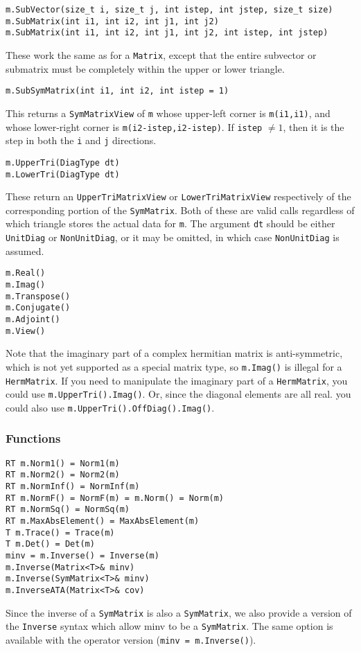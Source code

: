\documentclass[twoside,letterpaper,11pt]{article}
\renewcommand{\tt}[1]{{\texttt {#1}}}
\begin{document}
\begin{verbatim}
m.SubVector(size_t i, size_t j, int istep, int jstep, size_t size)
m.SubMatrix(int i1, int i2, int j1, int j2)
m.SubMatrix(int i1, int i2, int j1, int j2, int istep, int jstep)
\end{verbatim}
These work the same as for a \tt{Matrix}, except that the entire
subvector or submatrix must be completely within the upper or lower triangle.

\begin{verbatim}
m.SubSymMatrix(int i1, int i2, int istep = 1)
\end{verbatim}
This returns a \tt{SymMatrixView} of \tt{m} whose upper-left
corner is \tt{m(i1,i1)}, and whose lower-right corner is 
\tt{m(i2-istep,i2-istep)}.  If \tt{istep} $\neq 1$, then it is the 
step in both the \tt{i} and \tt{j} directions.

\begin{verbatim}
m.UpperTri(DiagType dt)
m.LowerTri(DiagType dt)
\end{verbatim}
These return an \tt{UpperTriMatrixView} or \tt{LowerTriMatrixView} respectively of the 
corresponding portion of the \tt{SymMatrix}.  Both of these are valid calls regardless
of which triangle stores the actual data for \tt{m}.  The argument \tt{dt} should
be either \tt{UnitDiag} or \tt{NonUnitDiag}, or it may be omitted, in which case
\tt{NonUnitDiag} is assumed.

\begin{verbatim}
m.Real()
m.Imag()
m.Transpose()
m.Conjugate()
m.Adjoint()
m.View()
\end{verbatim}
Note that the imaginary part of a complex hermitian matrix is anti-symmetric,
which is not yet supported as a special matrix type,
so \tt{m.Imag()} is illegal for a \tt{HermMatrix}.  If you need to
manipulate the imaginary part of a \tt{HermMatrix},
you could use \tt{m.UpperTri().Imag()}.  Or, 
since the diagonal elements are all real.
you could also use \tt{m.UpperTri().OffDiag().Imag()}. 

\subsubsection{Functions}

\begin{verbatim}
RT m.Norm1() = Norm1(m)
RT m.Norm2() = Norm2(m)
RT m.NormInf() = NormInf(m)
RT m.NormF() = NormF(m) = m.Norm() = Norm(m)
RT m.NormSq() = NormSq(m)
RT m.MaxAbsElement() = MaxAbsElement(m)
T m.Trace() = Trace(m)
T m.Det() = Det(m)
minv = m.Inverse() = Inverse(m)
m.Inverse(Matrix<T>& minv)
m.Inverse(SymMatrix<T>& minv)
m.InverseATA(Matrix<T>& cov)
\end{verbatim}
Since the inverse of a \tt{SymMatrix} is also a \tt{SymMatrix},
we also provide a version of the \tt{Inverse} syntax which allow minv
to be a \tt{SymMatrix}.  The same option is available with the operator version
(\tt{minv = m.Inverse()}).
\end{document}
